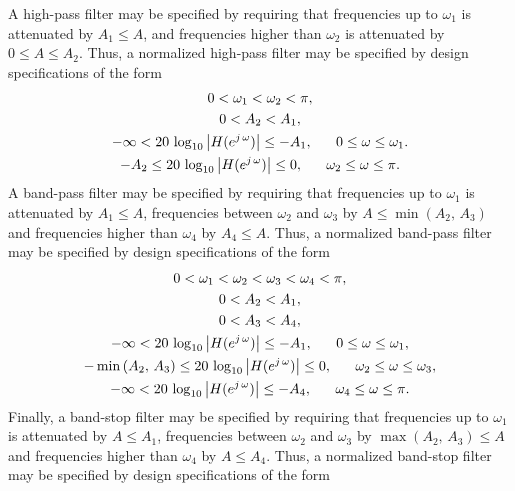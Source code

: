 \documentclass{sebase}
\begin{document}
A high-pass filter may be specified by requiring that frequencies up to $%
\omega _{1}$ is attenuated by $A_{1}\leq A$, and frequencies higher than $%
\omega _{2}$ is attenuated by $0\leq A\leq A_{2}$. Thus, a normalized
high-pass filter may be specified by design specifications of the form 
\begin{gather}
0<\omega _{1}<\omega _{2}<\pi ,  \label{Spec_1_high} \\
0<A_{2}<A_{1},  \label{Spec_2_high} \\
-\infty <20\,\log _{10}\left| H(e^{j\,\omega })\right| \leq -A_{1},\text{ \
\ \ \ }0\leq \omega \leq \omega _{1}.  \label{Spec_3_high} \\
-A_{2}\leq 20\,\log _{10}\left| H(e^{j\,\omega })\right| \leq 0,\text{ \ \ \
\ }\omega _{2}\leq \omega \leq \pi .  \label{Spec_4_high}
\end{gather}
A band-pass filter may be specified by requiring that frequencies up to $%
\omega _{1}$ is attenuated by $A_{1}\leq A$, frequencies between $\omega
_{2} $ and $\omega _{3}$ by $A\leq \min \left( A_{2},\,A_{3}\right) $ and
frequencies higher than $\omega _{4}$ by $A_{4}\leq A.$ Thus, a normalized
band-pass filter may be specified by design specifications of the form 
\begin{gather}
0<\omega _{1}<\omega _{2}<\omega _{3}<\omega _{4}<\pi ,
\label{Spec_1_BandPass} \\
0<A_{2}<A_{1},  \label{Spec_2_BandPass} \\
0<A_{3}<A_{4},  \label{Spec_3_BandPass} \\
-\infty <20\,\log _{10}\left| H(e^{j\,\omega })\right| \leq -A_{1},\text{ \
\ \ \ }0\leq \omega \leq \omega _{1},  \label{Spec_4_BandPass} \\
-\min \left( A_{2},\,A_{3}\right) \leq 20\,\log _{10}\left| H(e^{j\,\omega
})\right| \leq 0,\text{ \ \ \ \ }\omega _{2}\leq \omega \leq \omega _{3},
\label{Spec_5_BandPass} \\
-\infty <20\,\log _{10}\left| H(e^{j\,\omega })\right| \leq -A_{4},\text{ \
\ \ \ }\omega _{4}\leq \omega \leq \pi .  \label{Spec_6_BandPass}
\end{gather}
Finally, a band-stop filter may be specified by requiring that frequencies
up to $\omega _{1}$ is attenuated by $A\leq A_{1}$, frequencies between $%
\omega _{2}$ and $\omega _{3}$ by $\max \left( A_{2},\,A_{3}\right) \leq A$
and frequencies higher than $\omega _{4}$ by $A\leq A_{4}.$ Thus, a
normalized band-stop filter may be specified by design specifications of the
form 
\end{document}
